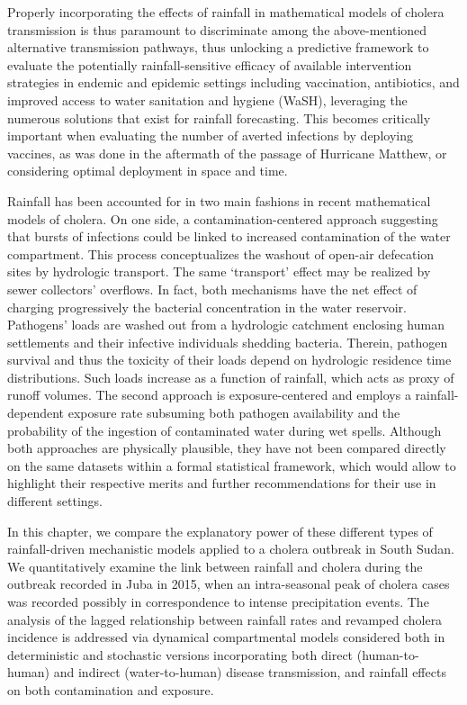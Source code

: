 Properly incorporating the effects of rainfall in mathematical models of cholera transmission is thus paramount to discriminate among the above-mentioned alternative transmission pathways, thus unlocking a predictive framework to evaluate the potentially rainfall-sensitive efficacy of available intervention strategies in endemic and epidemic settings including vaccination, antibiotics, and improved access to water sanitation and hygiene (WaSH), leveraging the numerous solutions that exist for rainfall forecasting. This becomes  critically important when evaluating the number of averted infections by deploying vaccines, as was done in the aftermath of the passage of Hurricane Matthew, or considering optimal deployment in space and time.

Rainfall has been accounted for in two main fashions in recent mathematical models of cholera. On one side, a contamination-centered approach suggesting that bursts of infections could be linked to increased contamination of the water compartment. This process conceptualizes the washout of open-air defecation sites by hydrologic transport. The same `transport' effect may be realized by sewer collectors' overflows. In fact, both mechanisms have the net effect of charging progressively the bacterial concentration in the water reservoir. Pathogens' loads are washed out from a hydrologic catchment enclosing human settlements and their infective individuals shedding bacteria. Therein, pathogen survival and thus the toxicity of their loads depend on hydrologic residence time distributions. Such loads increase as a function of rainfall, which acts as proxy of runoff volumes. The second approach is exposure-centered and employs a rainfall-dependent exposure rate subsuming both pathogen availability and the probability of the ingestion of contaminated water during wet spells. Although both approaches are physically plausible, they have not been compared directly on the same datasets within a formal statistical framework, which would allow to highlight their respective merits and further recommendations for their use in different settings.

In this chapter, we compare the explanatory power of these different types of rainfall-driven mechanistic models applied to a cholera outbreak in South Sudan. We quantitatively examine the link between rainfall and cholera during the outbreak recorded in Juba in 2015, when an intra-seasonal peak of cholera cases was recorded possibly in correspondence to intense precipitation events. The analysis of the lagged relationship between rainfall rates and revamped cholera incidence is addressed via dynamical compartmental models considered both in deterministic and stochastic versions incorporating both direct (human-to-human) and indirect (water-to-human) disease transmission, and rainfall effects on both contamination and exposure.
